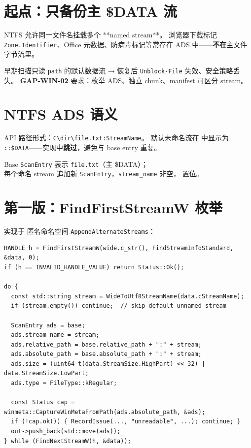 
\section{起点：只备份主 \$DATA 流}

NTFS 允许同一文件名挂载多个 **named stream**。
浏览器下载标记 \texttt{Zone.Identifier}、Office 元数据、防病毒标记等常存在 ADS 中——\textbf{不在}主文件字节流里。

早期扫描只读 \texttt{path} 的默认数据流 → 恢复后 \texttt{Unblock-File} 失效、安全策略丢失。
\textbf{GAP-WIN-02} 要求：枚举 ADS、独立 chunk、manifest 可区分 stream。

\section{NTFS ADS 语义}

API 路径形式：\texttt{C\textbackslash dir\textbackslash file.txt:StreamName}。
默认未命名流在  中显示为 \texttt{::\$DATA}——实现中\textbf{跳过}，避免与 base entry 重复。

\begin{designbox}
Base \texttt{ScanEntry} 表示 \texttt{file.txt}（主 \$DATA）；\\
每个命名 stream 追加新 \texttt{ScanEntry}，\texttt{stream\_name} 非空， 置位。
\end{designbox}

\section{第一版：FindFirstStreamW 枚举}

实现于  匿名命名空间 \texttt{AppendAlternateStreams}：

\begin{lstlisting}[caption={AppendAlternateStreams (scan\_entry.cc)}]
HANDLE h = FindFirstStreamW(wide.c_str(), FindStreamInfoStandard, &data, 0);
if (h == INVALID_HANDLE_VALUE) return Status::Ok();

do {
  const std::string stream = WideToUtf8StreamName(data.cStreamName);
  if (stream.empty()) continue;  // skip default unnamed stream

  ScanEntry ads = base;
  ads.stream_name = stream;
  ads.relative_path = base.relative_path + ":" + stream;
  ads.absolute_path = base.absolute_path + ":" + stream;
  ads.size = (uint64_t(data.StreamSize.HighPart) << 32) | data.StreamSize.LowPart;
  ads.type = FileType::kRegular;

  const Status cap = winmeta::CaptureWinMetaFromPath(ads.absolute_path, &ads);
  if (!cap.ok()) { RecordIssue(..., "unreadable", ...); continue; }
  out->push_back(std::move(ads));
} while (FindNextStreamW(h, &data));
\end{lstlisting}

